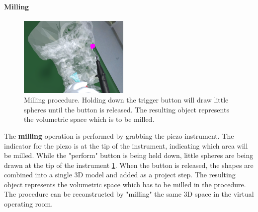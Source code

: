 \paragraph{Milling}

\begin{figure}[ht]
    \centering
    \includegraphics[width=200px]{images/implementation/features/procedures/piezo.png}
    \caption{\label{fig::FeaturePiezo}Milling procedure. Holding down the trigger button will draw little spheres until the button is released. The resulting object represents the volumetric space which is to be milled.}
\end{figure}

The \textbf{milling} operation is performed by grabbing the piezo instrument.
The indicator for the piezo is at the tip of the instrument, indicating which area will be milled.
While the "perform" button is being held down, little spheres are being drawn at the tip of the instrument \ref{fig::FeaturePiezo}.
When the button is released, the shapes are combined into a single 3D model and added as a project step.
The resulting object represents the volumetric space which has to be milled in the procedure.
The procedure can be reconstructed by "milling" the same 3D space in the virtual operating room.